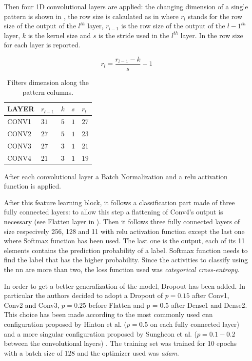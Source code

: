 Then four 1D convolutional layers are applied: the changing dimension of a single pattern is shown in , the row size is calculated as in  where $r_l$ stands for the row size of the output of the $l^{th}$ layer, $r_{l-1}$ is the row size of the output of the $l-1^{th}$ layer, $k$ is the kernel size and $s$ is the stride used in the $l^{th}$ layer. In  the row size for each layer is reported.

\begin{equation}
  \label{eq:row_size}
  r_l = \frac{r_{l-1} - k}{s} + 1
\end{equation}


\begin{table}[htp]
\small
	\centering
		\renewcommand{\arraystretch}{1}%
	\begin{tabular}{@{}lllll@{}}
	\toprule
	LAYER & $r_{l-1}$ & $k$ & $s$ & $r_l$\\
	\midrule
	CONV1 & $31$ & $5$ & $1$ & $27$\\
	CONV2 & $27$ & $5$ & $1$ & $23$\\
	CONV3 & $27$ & $3$ & $1$ & $21$\\
	CONV4 & $21$ & $3$ & $1$ & $19$\\
	\bottomrule
	\end{tabular}
	\caption{Filters dimension along the pattern columns.}
	\label{tab:filtersize}
\end{table}

After each convolutional layer a Batch Normalization and a \gls{relu} activation function is applied.

After this feature learning block, it follows a classification part made of three fully connected layers: to allow this step a flattening of Conv4's output is necessary (see Flatten layer in ). Then it follows three fully connected layers of size respecively 256, 128 and 11 with \gls{relu} activation function except the last one where Softmax function has been used. The last one is the output, each of its 11 elements contains the prediction probability of a label. Softmax function needs to find the label that has the higher probability. Since the activities to classify using the \gls{nn} are more than two, the loss function used was \textit{categorical cross-entropy}.

In order to get a better generalization of the model, Dropout has been added. In particular the authors decided to adopt a Dropout of $p = 0.15$ after Conv1, Conv2 and Conv3, $p = 0.25$ before Flatten and p = 0.5 after Dense1 and Dense2. This choice has been made according to the most commonly used \gls{cnn} configuration proposed by Hinton et al. ($p = 0.5$ on each fully connected layer) and a more singular configuration proposed by Sungheon et al. ($p = 0.1-0.2$ between the convolutional layers) \cite{Hinton12}\cite{Sungheon17}.
The training set was trained for 10 epochs with a batch size of 128 and the optimizer used was \textit{adam}.
